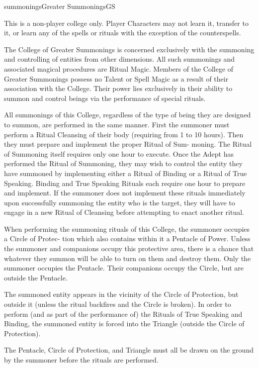 \begin{College}[1.0]{summonings}{Greater Summonings}{GS}

This is a non-player college only.  Player Characters may not learn
it, transfer to it, or learn any of the spells or rituals with the
exception of the counterspells.

The College of Greater Summonings is concerned exclusively with the
summoning and controlling of entities from other dimensions.  All such
summonings and associated magical procedures are Ritual Magic.
Members of the College of Greater Summonings possess no Talent or
Spell Magic as a result of their association with the College.  Their
power lies exclusively in their ability to summon and control beings
via the performance of special rituals.

All summonings of this College, regardless of the type of being they
are designed to summon, are performed in the same manner. First the
summoner must perform a Ritual Cleansing of their body (requiring from
1 to 10 hours).  Then they must prepare and implement the proper
Ritual of Sum- moning.  The Ritual of Summoning itself requires only
one hour to execute.  Once the Adept has performed the Ritual of
Summoning, they may wish to control the entity they have summoned by
implementing either a Ritual of Binding or a Ritual of True Speaking.
Binding and True Speaking Rituals each require one hour to prepare and
implement.  If the summoner does not implement these rituals
immediately upon successfully summoning the entity who is the target,
they will have to engage in a new Ritual of Cleansing before
attempting to enact another ritual.

When performing the summoning rituals of this College, the summoner
occupies a Circle of Protec- tion which also contains within it a
Pentacle of Power.  Unless the summoner and companions occupy this
protective area, there is a chance that whatever they summon will be
able to turn on them and destroy them. Only the summoner occupies the
Pentacle. Their companions occupy the Circle, but are outside the
Pentacle.

The summoned entity appears in the vicinity of the Circle of
Protection, but outside it (unless the ritual backfires and the Circle
is broken).  In order to perform (and as part of the performance of)
the Rituals of True Speaking and Binding, the summoned entity is
forced into the Triangle (outside the Circle of Protection).

The Pentacle, Circle of Protection, and Triangle must all be drawn on
the ground by the summoner before the rituals are performed.


\end{College}
